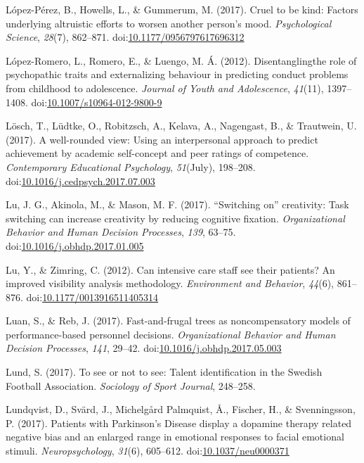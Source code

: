 \documentclass[english,man]{apa6}
\begin{document}
\hypertarget{ref-Lopez-Perez2017}{}
López-Pérez, B., Howells, L., \& Gummerum, M. (2017). Cruel to be kind:
Factors underlying altruistic efforts to worsen another person's mood.
\emph{Psychological Science}, \emph{28}(7), 862--871.
doi:\href{https://doi.org/10.1177/0956797617696312}{10.1177/0956797617696312}

\hypertarget{ref-Lopez-Romero2012}{}
López-Romero, L., Romero, E., \& Luengo, M. Á. (2012). Disentanglingthe
role of psychopathic traits and externalizing behaviour in predicting
conduct problems from childhood to adolescence. \emph{Journal of Youth
and Adolescence}, \emph{41}(11), 1397--1408.
doi:\href{https://doi.org/10.1007/s10964-012-9800-9}{10.1007/s10964-012-9800-9}

\hypertarget{ref-Losch2017}{}
Lösch, T., Lüdtke, O., Robitzsch, A., Kelava, A., Nagengast, B., \&
Trautwein, U. (2017). A well-rounded view: Using an interpersonal
approach to predict achievement by academic self-concept and peer
ratings of competence. \emph{Contemporary Educational Psychology},
\emph{51}(July), 198--208.
doi:\href{https://doi.org/10.1016/j.cedpsych.2017.07.003}{10.1016/j.cedpsych.2017.07.003}

\hypertarget{ref-Lu2017}{}
Lu, J. G., Akinola, M., \& Mason, M. F. (2017). ``Switching on''
creativity: Task switching can increase creativity by reducing cognitive
fixation. \emph{Organizational Behavior and Human Decision Processes},
\emph{139}, 63--75.
doi:\href{https://doi.org/10.1016/j.obhdp.2017.01.005}{10.1016/j.obhdp.2017.01.005}

\hypertarget{ref-Lu2012}{}
Lu, Y., \& Zimring, C. (2012). Can intensive care staff see their
patients? An improved visibility analysis methodology. \emph{Environment
and Behavior}, \emph{44}(6), 861--876.
doi:\href{https://doi.org/10.1177/0013916511405314}{10.1177/0013916511405314}

\hypertarget{ref-Luan2017}{}
Luan, S., \& Reb, J. (2017). Fast-and-frugal trees as noncompensatory
models of performance-based personnel decisions. \emph{Organizational
Behavior and Human Decision Processes}, \emph{141}, 29--42.
doi:\href{https://doi.org/10.1016/j.obhdp.2017.05.003}{10.1016/j.obhdp.2017.05.003}

\hypertarget{ref-Lund2017}{}
Lund, S. (2017). To see or not to see: Talent identification in the
Swedish Football Association. \emph{Sociology of Sport Journal},
248--258.

\hypertarget{ref-Lundqvist2017}{}
Lundqvist, D., Svärd, J., Michelgård Palmquist, Å., Fischer, H., \&
Svenningsson, P. (2017). Patients with Parkinson's Disease display a
dopamine therapy related negative bias and an enlarged range in
emotional responses to facial emotional stimuli. \emph{Neuropsychology},
\emph{31}(6), 605--612.
doi:\href{https://doi.org/10.1037/neu0000371}{10.1037/neu0000371}
\end{document}
